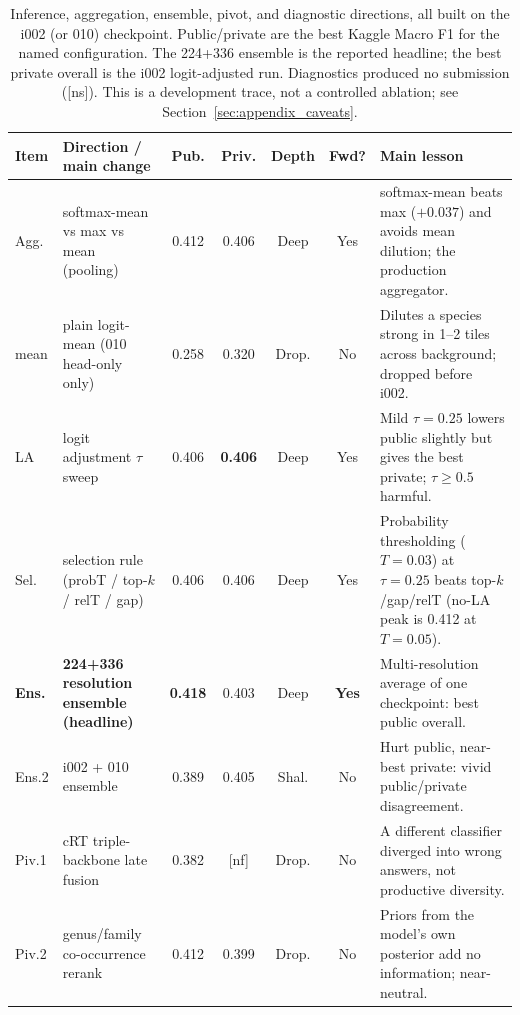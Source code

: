 \begin{table}[t]
\centering
\scriptsize
\setlength{\tabcolsep}{4pt}
\renewcommand{\arraystretch}{1.15}
\caption{Inference, aggregation, ensemble, pivot, and diagnostic directions, all built on
the i002 (or 010) checkpoint. Public/private are the best Kaggle Macro F1 for the named
configuration. The 224+336 ensemble is the reported headline; the best private overall is
the i002 logit-adjusted run. Diagnostics produced no submission ([ns]). This is a
development trace, not a controlled ablation; see Section~\ref{sec:appendix_caveats}.}
\label{tab:appendix_inference}
\begin{tabularx}{\linewidth}{@{}l l c c c c X@{}}
\toprule
\textbf{Item} & \textbf{Direction / main change} & \textbf{Pub.} & \textbf{Priv.} & \textbf{Depth} & \textbf{Fwd?} & \textbf{Main lesson} \\
\midrule
Agg. & softmax-mean vs max vs mean (pooling) & 0.412 & 0.406 & Deep & Yes & softmax-mean beats max ($+0.037$) and avoids mean dilution; the production aggregator. \\
mean & plain logit-mean (010 head-only only) & 0.258 & 0.320 & Drop. & No & Dilutes a species strong in 1--2 tiles across background; dropped before i002. \\
LA & logit adjustment $\tau$ sweep & 0.406 & \textbf{0.406} & Deep & Yes & Mild $\tau{=}0.25$ lowers public slightly but gives the best private; $\tau{\geq}0.5$ harmful. \\
Sel. & selection rule (probT / top-$k$ / relT / gap) & 0.406 & 0.406 & Deep & Yes & Probability thresholding ($T{=}0.03$) at $\tau{=}0.25$ beats top-$k$/gap/relT (no-LA peak is 0.412 at $T{=}0.05$). \\
\textbf{Ens.} & \textbf{224+336 resolution ensemble (headline)} & \textbf{0.418} & 0.403 & Deep & \textbf{Yes} & Multi-resolution average of one checkpoint: best public overall. \\
Ens.2 & i002 + 010 ensemble & 0.389 & 0.405 & Shal. & No & Hurt public, near-best private: vivid public/private disagreement. \\
Piv.1 & cRT triple-backbone late fusion & 0.382 & [nf] & Drop. & No & A different classifier diverged into wrong answers, not productive diversity. \\
Piv.2 & genus/family co-occurrence rerank & 0.412 & 0.399 & Drop. & No & Priors from the model's own posterior add no information; near-neutral. \\

\end{tabularx}
\end{table}
